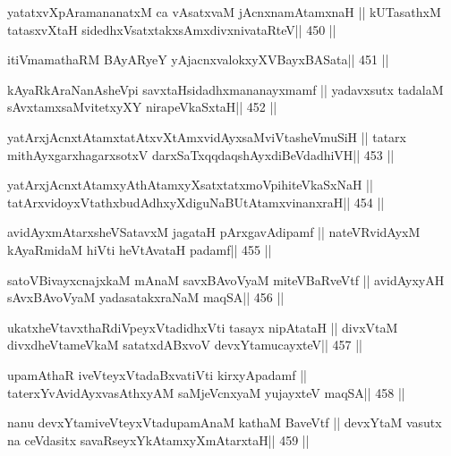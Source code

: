 \begin{shl}
yatatxvXpAramananatxM ca vAsatxvaM jAcnxnamAtamxnaH ||
kUTasathxM tatasxvXtaH sidedhxVsatxtakxsAmxdivxnivataRteV\hfill || 450 ||
\end{shl}

\begin{shl}
itiVmamathaRM BAyARyeY yAjacnxvalokxyXV\s BayxBASata\hfill || 451 ||
\end{shl}

\begin{shl}
kAyaRkAraNanAsheV\s pi savxtaHsidadhxmananayxmamf ||
yadavxsutx tadalaM sAvxtamxsaMvitetxyXY nirapeVkaSxtaH\hfill || 452 ||
\end{shl}

\begin{shl}
yatArxjAcnxtAtamxtatAtxvXtAmx\s vidAyxsaMviVtasheVmuSiH ||
tatarx mithAyxgarxhagarxsotxV darxSaTxqqdaqshAyxdiBeVdadhiVH\hfill || 453 ||
\end{shl}

\begin{shl}
yatArxjAcnxtAtamxyAthAtamxyXsatxtatxmoVpihiteVkaSxNaH ||
tatArxvidoyxVtathxbudAdhxyXdiguNaBUtAtamxvinanxraH\hfill || 454 ||
\end{shl}

\begin{shl}
avidAyxmAtarxsheVSatavxM jagataH pArxgavAdipamf ||
nateVR\s vidAyxM kAyaRmidaM hiVti heVtAvataH padamf\hfill || 455 ||
\end{shl}

\begin{shl}
satoV\s BivayxcnajxkaM mAnaM savxBAvoV\s yaM miteVBaRveVtf ||
avidAyxyAH sAvxBAvoV\s yaM yadasatakxraNaM maqSA\hfill || 456 ||
\end{shl}

\begin{shl}
ukatxheVtavxthaRdiVpeyxVtadidhxVti tasayx nipAtataH ||
divxVtaM divxdheVtameVkaM satatxdABxvoV devxYtamucayxteV\hfill || 457 ||
\end{shl}

\begin{shl}
upamAthaR iveVteyxVtadaBxvatiVti kirxyApadamf ||
taterxYvAvidAyxvasAthxyAM saMjeVcnxyaM yujayxteV maqSA\hfill || 458 ||
\end{shl}

\begin{shl}
nanu devxYtamiveVteyxVtadupamAnaM kathaM BaveVtf ||
devxYtaM vasutx na ceVdasitx savaRseyxYkAtamxyXmAtarxtaH\hfill || 459 ||
\end{shl}

